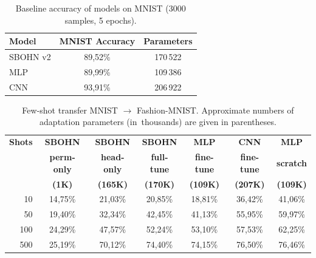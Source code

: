 \begin{table}[htbp]
\centering
\caption{Baseline accuracy of models on MNIST (3000 samples, 5 epochs).}
\label{tab:fewshot_base}
\begin{tabular}{l|c|c}
\hline
\textbf{Model} & \textbf{MNIST Accuracy} & \textbf{Parameters} \\
\hline
SBOHN v2 & 89{,}52\% & 170\,522 \\
MLP      & 89{,}99\% & 109\,386 \\
CNN      & 93{,}91\% & 206\,922 \\
\hline
\end{tabular}
\end{table}

\begin{table}[htbp]
\centering
\caption{Few-shot transfer MNIST $\to$ Fashion-MNIST. Approximate numbers of adaptation parameters (in~thousands) are given in parentheses.}
\label{tab:fewshot_transfer}
\begin{tabular}{r|c|c|c|c|c|c}
\hline
\textbf{Shots} & \textbf{SBOHN} & \textbf{SBOHN} & \textbf{SBOHN} & \textbf{MLP} & \textbf{CNN} & \textbf{MLP} \\
       & \textbf{perm-only} & \textbf{head-only} & \textbf{full-tune} & \textbf{fine-tune} & \textbf{fine-tune} & \textbf{scratch} \\
       & \textbf{(1K)} & \textbf{(165K)} & \textbf{(170K)} & \textbf{(109K)} & \textbf{(207K)} & \textbf{(109K)} \\
\hline
10  & 14{,}75\% & 21{,}03\% & 20{,}85\% & 18{,}81\% & 36{,}42\% & 41{,}06\% \\
50  & 19{,}40\% & 32{,}34\% & 42{,}45\% & 41{,}13\% & 55{,}95\% & 59{,}97\% \\
100 & 24{,}29\% & 47{,}57\% & 52{,}24\% & 53{,}10\% & 57{,}53\% & 62{,}25\% \\
500 & 25{,}19\% & 70{,}12\% & 74{,}40\% & 74{,}15\% & 76{,}50\% & 76{,}46\% \\
\hline
\end{tabular}
\end{table}
